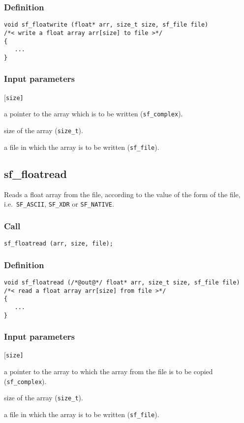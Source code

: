 \subsubsection*{Definition}
\begin{verbatim}
void sf_floatwrite (float* arr, size_t size, sf_file file)
/*< write a float array arr[size] to file >*/
{
   ...
}
\end{verbatim}

\subsubsection*{Input parameters}
\begin{desclist}{\tt }{\quad}[\tt size]
   \setlength\itemsep{0pt}
   \item[arr]  a pointer to the array which is to be written (\texttt{sf\_complex}). 
   \item[size] size of the array (\texttt{size\_t}). 
   \item[file] a file in which the array is to be written (\texttt{sf\_file}).
\end{desclist}




\subsection{{sf\_floatread}}\label{sec:sf_floatread}
Reads a float array from the file, according to the value of the form of the file, i.e.~\texttt{SF\_ASCII}, \texttt{SF\_XDR} or \texttt{SF\_NATIVE}.

\subsubsection*{Call}
\begin{verbatim}sf_floatread (arr, size, file);\end{verbatim}

\subsubsection*{Definition}
\begin{verbatim}
void sf_floatread (/*@out@*/ float* arr, size_t size, sf_file file)
/*< read a float array arr[size] from file >*/
{
   ...
}
\end{verbatim}

\subsubsection*{Input parameters}
\begin{desclist}{\tt }{\quad}[\tt size]
   \setlength\itemsep{0pt}
   \item[arr]  a pointer to the array to which the array from the file is to be copied (\texttt{sf\_complex}). 
   \item[size] size of the array (\texttt{size\_t}). 
   \item[file] a file in which the array is to be written (\texttt{sf\_file}).
\end{desclist}




